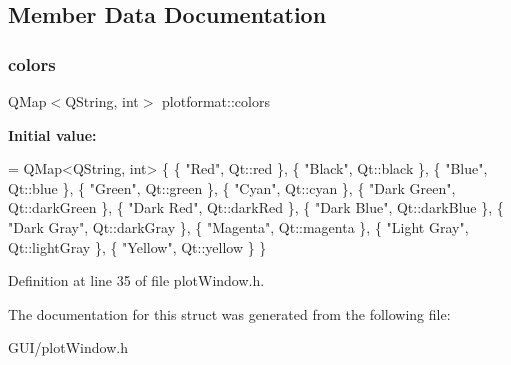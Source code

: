 \subsection{Member Data Documentation}
\mbox{\label{structplotformat_ae5437caf46f4f03326aee4e51b21c79d}} 
\subsubsection{\texorpdfstring{colors}{colors}}
{\footnotesize\ttfamily Q\+Map$<$Q\+String, int$>$ plotformat\+::colors}

{\bfseries Initial value\+:}
\begin{DoxyCode}
= QMap<QString, int> \{ \{ \textcolor{stringliteral}{"Red"}, Qt::red \}, \{ \textcolor{stringliteral}{"Black"}, Qt::black \}, \{ \textcolor{stringliteral}{"Blue"}, Qt::blue \}, \{ \textcolor{stringliteral}{"Green"}, 
      Qt::green \}, \{ \textcolor{stringliteral}{"Cyan"}, Qt::cyan \}, \{ \textcolor{stringliteral}{"Dark Green"}, Qt::darkGreen \},
    \{ \textcolor{stringliteral}{"Dark Red"}, Qt::darkRed \}, \{ \textcolor{stringliteral}{"Dark Blue"}, Qt::darkBlue \}, \{ \textcolor{stringliteral}{"Dark Gray"}, Qt::darkGray \}, \{ \textcolor{stringliteral}{"Magenta"},
       Qt::magenta \}, \{ \textcolor{stringliteral}{"Light Gray"}, Qt::lightGray \}, \{ \textcolor{stringliteral}{"Yellow"}, Qt::yellow \} \}
\end{DoxyCode}


Definition at line 35 of file plot\+Window.\+h.



The documentation for this struct was generated from the following file\+:\begin{DoxyCompactItemize}
\item 
G\+U\+I/plot\+Window.\+h\end{DoxyCompactItemize}
